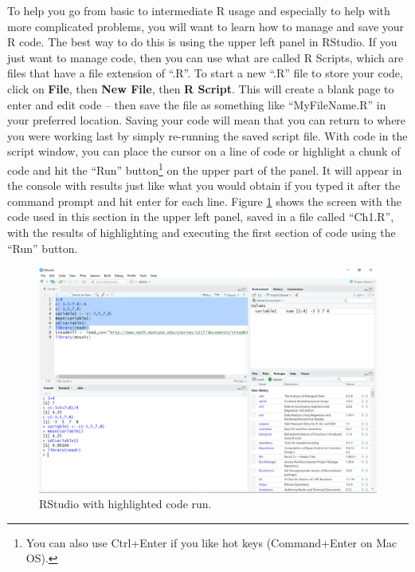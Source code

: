 \documentclass[
]{book}
\begin{document}
\indent To help you go from basic to intermediate R usage and especially to help with more
complicated problems, you will want to learn how to manage and save your R code.
The best way to do this is using the upper left panel in RStudio. If you just want to manage code, then you can use what
are called R Scripts, which are files that have a file extension of ``.R''. To
start a new ``.R'' file to store your code, click on \textbf{File}, then
\textbf{New File}, then \textbf{R Script}. This will create a blank page to enter and
edit code -- then save the file as something like ``MyFileName.R'' in your preferred location.
Saving your code will mean that you can return to where you
were working last by simply re-running the saved script file. With code in the
script window, you can place the cursor on a line of code or highlight a chunk
of code and hit the ``Run'' button\footnote{You can also use Ctrl+Enter if you like hot keys (Command+Enter on Mac OS).}
on the upper part of the panel. It will appear
in the console with results just like what you would obtain if you typed it
after the command prompt and hit enter for each line. Figure \ref{fig:Figure1-4}
shows the screen with the code used in this
section in the upper left panel, saved in
a file called ``Ch1.R'', with the results of highlighting and executing the first
section of code using the ``Run'' button.



\begin{figure}[ht!]

{\centering \includegraphics[width=1\linewidth]{chapter1_files/fig1-4} 

}

\caption{RStudio with highlighted code run.}\label{fig:Figure1-4}
\end{figure}
\end{document}
